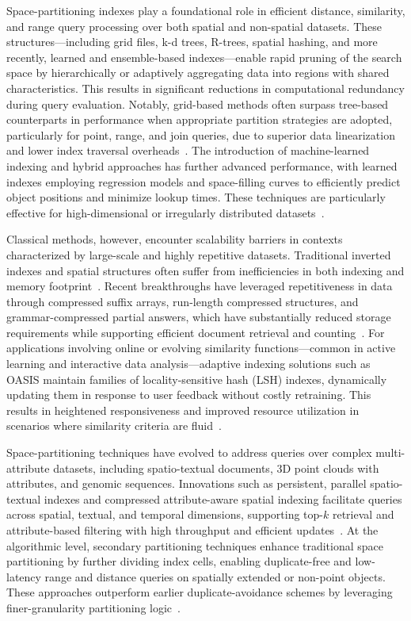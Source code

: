\documentclass[11pt]{article}
\begin{document}
Space-partitioning indexes play a foundational role in efficient distance, similarity, and range query processing over both spatial and non-spatial datasets. These structures—including grid files, k-d trees, R-trees, spatial hashing, and more recently, learned and ensemble-based indexes—enable rapid pruning of the search space by hierarchically or adaptively aggregating data into regions with shared characteristics. This results in significant reductions in computational redundancy during query evaluation. Notably, grid-based methods often surpass tree-based counterparts in performance when appropriate partition strategies are adopted, particularly for point, range, and join queries, due to superior data linearization and lower index traversal overheads~\cite{ref31,ref35}. The introduction of machine-learned indexing and hybrid approaches has further advanced performance, with learned indexes employing regression models and space-filling curves to efficiently predict object positions and minimize lookup times. These techniques are particularly effective for high-dimensional or irregularly distributed datasets~\cite{ref35,ref51,ref54,ref111}.

Classical methods, however, encounter scalability barriers in contexts characterized by large-scale and highly repetitive datasets. Traditional inverted indexes and spatial structures often suffer from inefficiencies in both indexing and memory footprint~\cite{ref75,ref98}. Recent breakthroughs have leveraged repetitiveness in data through compressed suffix arrays, run-length compressed structures, and grammar-compressed partial answers, which have substantially reduced storage requirements while supporting efficient document retrieval and counting~\cite{ref73,ref91}. For applications involving online or evolving similarity functions—common in active learning and interactive data analysis—adaptive indexing solutions such as OASIS maintain families of locality-sensitive hash (LSH) indexes, dynamically updating them in response to user feedback without costly retraining. This results in heightened responsiveness and improved resource utilization in scenarios where similarity criteria are fluid~\cite{ref56,ref111}.

Space-partitioning techniques have evolved to address queries over complex multi-attribute datasets, including spatio-textual documents, 3D point clouds with attributes, and genomic sequences. Innovations such as persistent, parallel spatio-textual indexes and compressed attribute-aware spatial indexing facilitate queries across spatial, textual, and temporal dimensions, supporting top-$k$ retrieval and attribute-based filtering with high throughput and efficient updates~\cite{ref50,ref51,ref75,ref98,ref114,ref118}. At the algorithmic level, secondary partitioning techniques enhance traditional space partitioning by further dividing index cells, enabling duplicate-free and low-latency range and distance queries on spatially extended or non-point objects. These approaches outperform earlier duplicate-avoidance schemes by leveraging finer-granularity partitioning logic~\cite{ref114}.
\end{document}
